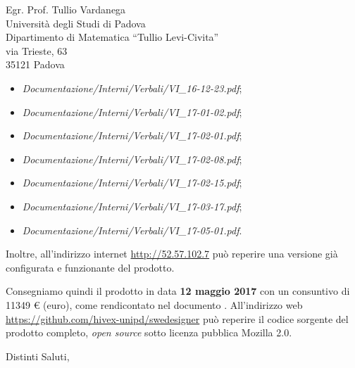 \documentclass[a4paper]{letter} %
\begin{document}
\begin{letter}{Egr. Prof. Tullio Vardanega\\
Università degli Studi di Padova\\
Dipartimento di Matematica “Tullio Levi-Civita”\\
via Trieste, 63\\
35121 Padova}
\begin{itemize}
\begin{itemize}
		\item \emph{Documentazione/Interni/Verbali/}\emph{VI\_16-12-23.pdf};
		\item \emph{Documentazione/Interni/Verbali/}\emph{VI\_17-01-02.pdf};
		\item \emph{Documentazione/Interni/Verbali/}\emph{VI\_17-02-01.pdf};
		\item \emph{Documentazione/Interni/Verbali/}\emph{VI\_17-02-08.pdf};
		\item \emph{Documentazione/Interni/Verbali/}\emph{VI\_17-02-15.pdf};
		\item \emph{Documentazione/Interni/Verbali/}\emph{VI\_17-03-17.pdf};
		\item \emph{Documentazione/Interni/Verbali/}\emph{VI\_17-05-01.pdf}.
	\end{itemize}
\end{itemize}
Inoltre, all'indirizzo internet \url{http://52.57.102.7} può reperire una versione già configurata e funzionante del prodotto.

Consegniamo quindi il prodotto in data \textbf{12 maggio 2017} con un consuntivo di \num{11349} \euro{} (euro), come rendicontato nel documento \PdP. All'indirizzo web \url{https://github.com/hivex-unipd/swedesigner} può reperire il codice sorgente del prodotto completo, \emph{open source} sotto licenza pubblica Mozilla 2.0.

\closing{Distinti Saluti,}

\end{letter}
\end{document}
